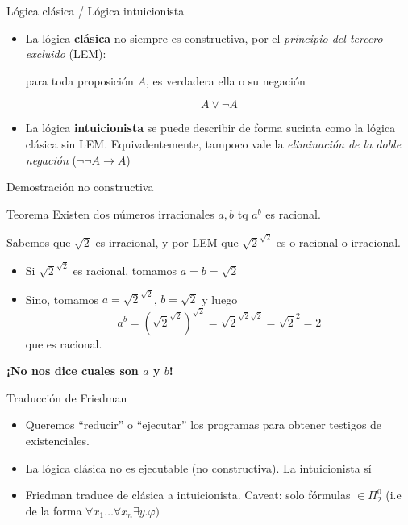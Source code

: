\documentclass{beamer}
\begin{document}
\begin{frame}{Lógica clásica / Lógica intuicionista}
    \begin{itemize}
        \item La lógica \textbf{clásica} no siempre es constructiva, por el \textit{principio del tercero excluido} (LEM): 
        
            \begin{center}
                para toda proposición $A$, es verdadera ella o su negación
            \end{center}
        $$A \vee \neg A$$

        \item La lógica \textbf{intuicionista} se puede describir de forma sucinta como la lógica clásica sin LEM. Equivalentemente, tampoco vale la \textit{eliminación de la doble negación} ($\neg\neg A \rightarrow A$)
    \end{itemize}
\end{frame}

\begin{frame}{Demostración no constructiva}
    \begin{block}{Teorema}
        Existen dos números irracionales $a, b$ tq $a^b$ es racional.
    \end{block}
    
    Sabemos que $\sqrt{2}$ es irracional, y por LEM que $\sqrt{2}^{\sqrt{2}}$ es o racional o irracional.
    \begin{itemize}
        \item Si $\sqrt{2}^{\sqrt{2}}$ es racional, tomamos $a = b = \sqrt{2}$
        \item Sino, tomamos $a = \sqrt{2}^{\sqrt{2}}$, $b = \sqrt{2}$ y luego
        \[a^b
            = (\sqrt{2}^{\sqrt{2}})^{\sqrt{2}}
            = \sqrt{2}^{\sqrt{2} \sqrt{2}}
            = \sqrt{2}^2 = 2
        \]
        que es racional.
    \end{itemize}

    \vspace{1cm}
    \textbf{¡No nos dice cuales son $a$ y $b$!}
\end{frame}


\begin{frame}{Traducción de Friedman}

\begin{itemize}
    \item Queremos ``reducir'' o ``ejecutar'' los programas para obtener testigos de existenciales.
    \item La lógica clásica no es ejecutable (no constructiva). La intuicionista sí
    \item Friedman traduce de clásica a intuicionista. Caveat: solo fórmulas $\in \Pi^0_2$ (i.e de la forma $\forall x_1 \dots \forall x_n \exists y . \varphi)$
\end{itemize}
    
\end{frame}
\end{document}
